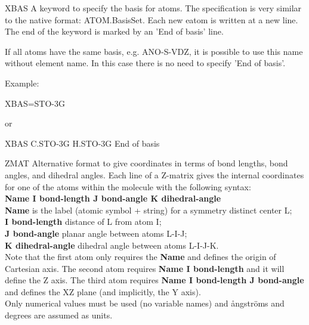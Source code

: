 \begin{keywordlist}

\item[XBAS]
A keyword to specify the basis for atoms. The specification is very similar 
to the native format: ATOM.BasisSet. Each new eatom is written at a new line.
The end of the keyword is marked by an 'End of basis' line.

If all atoms have the same basis, e.g. ANO-S-VDZ, it is possible to use 
this name without element name. In this case there is no need to specify 
'End of basis'.

Example:

\begin{inputlisting}
XBAS=STO-3G
\end{inputlisting}

or

\begin{inputlisting}
XBAS
C.STO-3G
H.STO-3G
End of basis
\end{inputlisting}


\item[ZMAT]
Alternative format to give coordinates in terms of bond lengths,
bond angles, and dihedral angles. 
Each line of a Z-matrix gives the
internal coordinates for one of the atoms within the molecule with the following
syntax:\\
{\bf Name  I  bond-length   J  bond-angle   K  dihedral-angle}\\
{\bf Name} is the label (atomic symbol + string) for a symmetry distinct center L;\\
{\bf I  bond-length} distance of L from atom I;\\
{\bf J  bond-angle} planar angle between atoms L-I-J;\\
{\bf K  dihedral-angle} dihedral angle between atoms L-I-J-K.\\
Note that the first atom only requires the {\bf Name} and defines the origin of
Cartesian axis.
The second atom requires {\bf Name  I  bond-length} and it will define the Z axis.
The third atom requires {\bf Name  I  bond-length	J  bond-angle} and defines the
XZ plane (and implicitly, the Y axis).\\
Only numerical values must be used (no variable names) and \aa ngstr\"oms
and degrees are assumed as units.


\end{keywordlist}
